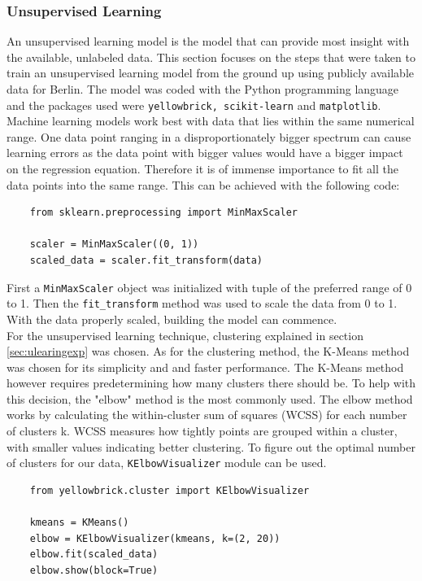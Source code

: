 \subsubsection{Unsupervised Learning}\label{sec:542}
An unsupervised learning model is the model that can provide most insight with the available, unlabeled data. This section focuses on the steps that were taken to train an unsupervised learning model from the ground up using publicly available data for Berlin. The model was coded with the Python programming language and the packages used were \verb|yellowbrick, scikit-learn| and \verb|matplotlib|. \\
Machine learning models work best with data that lies within the same numerical range. One data point ranging in a disproportionately bigger spectrum can cause learning errors as the data point with bigger values would have a bigger impact on the regression equation. Therefore it is of immense importance to fit all the data points into the same range. This can be achieved with the following code:
\begin{verbatim}
    from sklearn.preprocessing import MinMaxScaler
    
    scaler = MinMaxScaler((0, 1))
    scaled_data = scaler.fit_transform(data)
\end{verbatim}
First a \verb|MinMaxScaler| object was initialized with tuple of the preferred range of 0 to 1. Then the \verb|fit_transform| method was used to scale the data from 0 to 1. With the data properly scaled, building the model can commence.\\
For the unsupervised learning technique, clustering explained in section \ref{sec:ulearingexp} was chosen. As for the clustering method, the K-Means method was chosen for its simplicity and and faster performance. The K-Means method however requires predetermining how many clusters there should be. To help with this decision, the "elbow" method is the most commonly used\cite{KFG}. The elbow method works by calculating the within-cluster sum of squares (WCSS) for each number of clusters k. \gls{WCSS} measures how tightly points are grouped within a cluster, with smaller values indicating better clustering. To figure out the optimal number of clusters for our data, \verb|KElbowVisualizer| module can be used.
\begin{verbatim}
    from yellowbrick.cluster import KElbowVisualizer
    
    kmeans = KMeans()
    elbow = KElbowVisualizer(kmeans, k=(2, 20))
    elbow.fit(scaled_data)
    elbow.show(block=True)
\end{verbatim}
